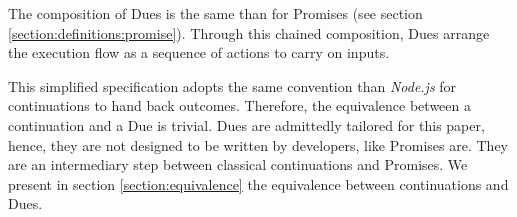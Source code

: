 The composition of Dues is the same than for Promises (see section \ref{section:definitions:promise}).
Through this chained composition, Dues arrange the execution flow as a sequence of actions to carry on inputs.




This simplified specification adopts the same convention than \textit{Node.js} for continuations to hand back outcomes.
Therefore, the equivalence between a continuation and a Due is trivial.
Dues are admittedly tailored for this paper, hence, they are not designed to be written by developers, like Promises are.
They are an intermediary step between classical continuations and Promises.
We present in section \ref{section:equivalence} the equivalence between continuations and Dues.


